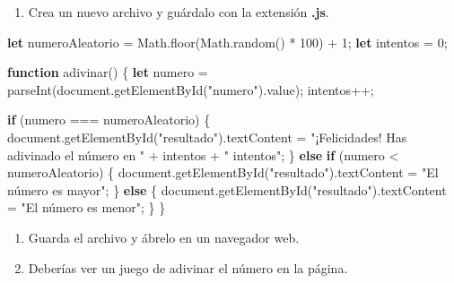 \documentclass[
  a4paper,
  DIV=11,
  numbers=noendperiod,
  onepage,
  openany]{scrreprt}
\newenvironment{Shaded}{\begin{snugshade}}{\end{snugshade}}
\newcommand{\AttributeTok}[1]{\textcolor[rgb]{0.40,0.45,0.13}{#1}}
\newcommand{\BuiltInTok}[1]{\textcolor[rgb]{0.00,0.23,0.31}{#1}}
\newcommand{\ControlFlowTok}[1]{\textcolor[rgb]{0.00,0.23,0.31}{\textbf{#1}}}
\newcommand{\DecValTok}[1]{\textcolor[rgb]{0.68,0.00,0.00}{#1}}
\newcommand{\FunctionTok}[1]{\textcolor[rgb]{0.28,0.35,0.67}{#1}}
\newcommand{\KeywordTok}[1]{\textcolor[rgb]{0.00,0.23,0.31}{\textbf{#1}}}
\newcommand{\NormalTok}[1]{\textcolor[rgb]{0.00,0.23,0.31}{#1}}
\newcommand{\OperatorTok}[1]{\textcolor[rgb]{0.37,0.37,0.37}{#1}}
\newcommand{\PreprocessorTok}[1]{\textcolor[rgb]{0.68,0.00,0.00}{#1}}
\newcommand{\StringTok}[1]{\textcolor[rgb]{0.13,0.47,0.30}{#1}}
\providecommand{\tightlist}{%
  \setlength{\itemsep}{0pt}\setlength{\parskip}{0pt}}\usepackage{longtable,booktabs,array}
\begin{document}
\begin{tcolorbox}
\begin{enumerate}
\def\labelenumi{\arabic{enumi}.}
\setcounter{enumi}{3}
\tightlist
\item
  Crea un nuevo archivo y guárdalo con la extensión \textbf{.js}.
\end{enumerate}

\begin{Shaded}
\begin{Highlighting}[]
\KeywordTok{let}\NormalTok{ numeroAleatorio }\OperatorTok{=} \BuiltInTok{Math}\OperatorTok{.}\FunctionTok{floor}\NormalTok{(}\BuiltInTok{Math}\OperatorTok{.}\FunctionTok{random}\NormalTok{() }\OperatorTok{*} \DecValTok{100}\NormalTok{) }\OperatorTok{+} \DecValTok{1}\OperatorTok{;}
\KeywordTok{let}\NormalTok{ intentos }\OperatorTok{=} \DecValTok{0}\OperatorTok{;}

\KeywordTok{function} \FunctionTok{adivinar}\NormalTok{() \{}
    \KeywordTok{let}\NormalTok{ numero }\OperatorTok{=} \PreprocessorTok{parseInt}\NormalTok{(}\BuiltInTok{document}\OperatorTok{.}\FunctionTok{getElementById}\NormalTok{(}\StringTok{"numero"}\NormalTok{)}\OperatorTok{.}\AttributeTok{value}\NormalTok{)}\OperatorTok{;}
\NormalTok{    intentos}\OperatorTok{++;}

    \ControlFlowTok{if}\NormalTok{ (numero }\OperatorTok{===}\NormalTok{ numeroAleatorio) \{}
        \BuiltInTok{document}\OperatorTok{.}\FunctionTok{getElementById}\NormalTok{(}\StringTok{"resultado"}\NormalTok{)}\OperatorTok{.}\AttributeTok{textContent} \OperatorTok{=} \StringTok{"¡Felicidades! Has adivinado el número en "} \OperatorTok{+}\NormalTok{ intentos }\OperatorTok{+} \StringTok{" intentos"}\OperatorTok{;}
\NormalTok{    \} }\ControlFlowTok{else} \ControlFlowTok{if}\NormalTok{ (numero }\OperatorTok{\textless{}}\NormalTok{ numeroAleatorio) \{}
        \BuiltInTok{document}\OperatorTok{.}\FunctionTok{getElementById}\NormalTok{(}\StringTok{"resultado"}\NormalTok{)}\OperatorTok{.}\AttributeTok{textContent} \OperatorTok{=} \StringTok{"El número es mayor"}\OperatorTok{;}
\NormalTok{    \} }\ControlFlowTok{else}\NormalTok{ \{}
        \BuiltInTok{document}\OperatorTok{.}\FunctionTok{getElementById}\NormalTok{(}\StringTok{"resultado"}\NormalTok{)}\OperatorTok{.}\AttributeTok{textContent} \OperatorTok{=} \StringTok{"El número es menor"}\OperatorTok{;}
\NormalTok{    \}}
\NormalTok{\}}
\end{Highlighting}
\end{Shaded}

\begin{enumerate}
\def\labelenumi{\arabic{enumi}.}
\setcounter{enumi}{4}
\item
  Guarda el archivo y ábrelo en un navegador web.
\item
  Deberías ver un juego de adivinar el número en la página.
\end{enumerate}


\end{tcolorbox}
\end{document}
